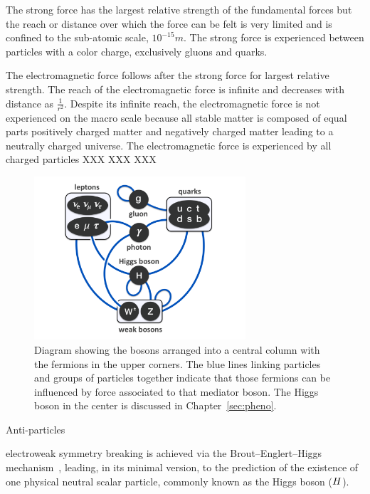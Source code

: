 The strong force has the largest relative strength of the fundamental forces but
the reach or distance over which the force can be felt is very limited and is 
confined to the sub-atomic scale, $10^{-15} m$. The strong force is experienced
between particles with a color charge, exclusively gluons and quarks.

The electromagnetic force follows after the strong force for largest relative
strength. The reach of the electromagnetic force is infinite and decreases with
distance as $\frac{1}{r^{2}}$. Despite its infinite reach, the electromagnetic 
force is not experienced on the macro scale because all stable matter is composed
of equal parts positively charged matter and negatively charged matter leading to
a neutrally charged universe. The electromagnetic force is experienced by all
charged particles XXX XXX XXX

\begin{figure}[htbp]
\centering
     \includegraphics[width=0.7\textwidth]{introduction/plots/elementary_particle_interactions_SM.pdf}
     \caption{
Diagram showing the bosons arranged into a central column with the fermions in the
upper corners. The blue lines linking particles and groups of particles together
indicate that those fermions can be influenced by force associated to that mediator
boson. The Higgs boson in the center is discussed in Chapter~\ref{sec:pheno}.
     }
     \label{fig:sm_particles}
\end{figure}



Anti-particles


electroweak symmetry breaking is achieved via the Brout--Englert--Higgs
mechanism~\cite{Englert:1964et,Higgs:1964ia,Higgs:1964pj,Guralnik:1964eu,Higgs:1966ev,Kibble:1967sv},
leading, in its minimal version, to the prediction of the existence of one physical neutral scalar particle,
commonly known as the Higgs boson ($H$).









